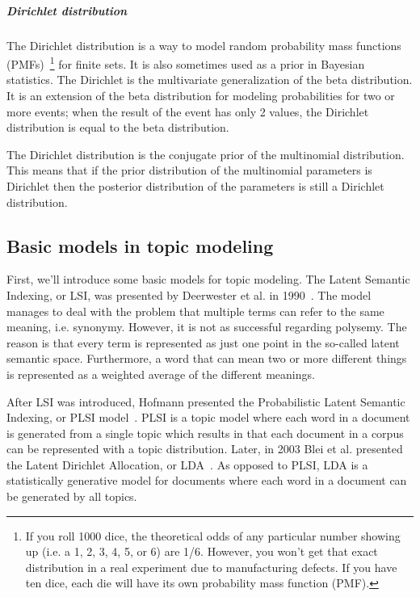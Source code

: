 \documentclass[12pt]{report}
\begin{document}
\subparagraph{Dirichlet distribution}

The Dirichlet distribution is a way to model random probability mass functions
(PMFs)~\footnote{If you roll 1000 dice, the theoretical odds of any particular
number showing up (i.e. a 1, 2, 3, 4, 5, or 6) are 1/6. However, you won't get
that exact distribution in a real experiment due to manufacturing defects. If
you have ten dice, each die will have its own probability mass function (PMF).}
for finite sets. It is also sometimes used as a prior in Bayesian statistics.
The Dirichlet is the multivariate generalization of the beta distribution. It
is an extension of the beta distribution for modeling probabilities for two or
more events; when the result of the event has only 2 values, the Dirichlet
distribution is equal to the beta distribution.

The Dirichlet distribution is the conjugate prior of the multinomial
distribution. This means that if the prior distribution of the
multinomial parameters is Dirichlet then the posterior distribution of the
parameters is still a Dirichlet distribution.

\subsection{Basic models in topic modeling}

First, we'll introduce some basic models for topic modeling. The
Latent Semantic Indexing, or LSI, was presented by Deerwester et al.
in 1990~\cite{Deerwester90indexingby}. The model manages to deal with the
problem that multiple terms can refer to the same meaning, i.e.
synonymy. However, it is not as successful regarding polysemy. The
reason is that every term is represented as just one point in the
so-called latent semantic space. Furthermore, a word that can mean two
or more different things is represented as a weighted average of the
different meanings.
 
After LSI was introduced, Hofmann presented the Probabilistic Latent
Semantic Indexing, or PLSI model~\cite{Hofmann:1999:PLS:312624.312649}. 
PLSI is a topic model where each word in a document is generated 
from a single topic which results in that each document in a corpus 
can be represented with a topic distribution. Later, in 2003 Blei et al. 
presented the Latent Dirichlet Allocation, or LDA~\cite{blei2003latent}. 
As opposed to PLSI, LDA is a statistically generative model for documents 
where each word in a document can be generated by all topics.
\end{document}
